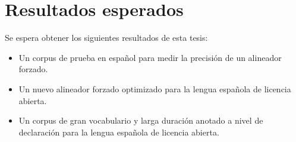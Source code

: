 \section{Resultados esperados}

Se espera obtener los siguientes resultados de esta tesis:

\begin{itemize}
    \item Un corpus de prueba en español para medir la precisión de un alineador forzado.
    \item Un nuevo alineador forzado optimizado para la lengua española de licencia abierta.
    \item Un corpus de gran vocabulario y larga duración anotado a nivel de declaración para la lengua española de licencia abierta.
\end{itemize}






